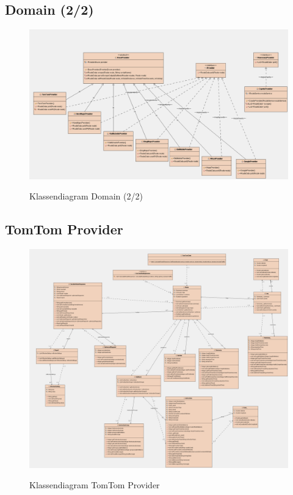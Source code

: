 \documentclass[a4paper]{article}
\begin{document}
\subsection{Domain (2/2)}

\begin{figure}[H]
\centering
\includegraphics[width=\textwidth]{Images/kdiadomain2r.png}\\
\caption{Klassendiagram Domain (2/2)}
\end{figure}

\subsection{TomTom Provider}

\begin{figure}[H]
\centering
\includegraphics[width=\textwidth]{Images/ktestprovidertomtomr.png}\\
\caption{Klassendiagram TomTom Provider}
\end{figure}
\end{document}
